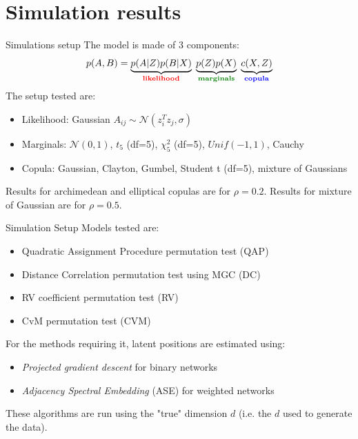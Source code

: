 \documentclass[10.5pt]{beamer}
\begin{document}
\section{Simulation results}

\begin{frame}{Simulations setup}
The model is made of 3 components:
\[
p(A, B) = \underbrace{p(A|Z) p(B|X)}_{\textbf{\color{red}likelihood}} \; \underbrace{p(Z) p(X)}_{\textbf{\color{green!50!black}marginals}} \; \underbrace{c(X, Z)}_{\textbf{\color{blue}copula}}
\]
The setup tested are:
\begin{itemize}
\item {\color{red}Likelihood}: Gaussian $A_{ij}\sim \mathcal{N}(z_i^T z_j, \sigma)$
\item {\color{green!50!black}Marginals}: $\mathcal{N}(0, 1)$, $t_5$ (df=5), $\chi^2_5$ (df=5), $Unif(-1, 1)$, Cauchy
\item {\color{blue}Copula}: Gaussian, Clayton, Gumbel, Student t (df=5), mixture of Gaussians
\end{itemize}
Results for archimedean and elliptical copulas are for $\rho=0.2$. Results for mixture of Gaussian are for $\rho=0.5$.
\end{frame}


\begin{frame}{Simulation Setup}
Models tested are:
\begin{itemize}
    \item Quadratic Assignment Procedure permutation test (QAP)
    \item Distance Correlation permutation test using MGC (DC)
    \item RV coefficient permutation test (RV)
    \item CvM permutation test (CVM)
\end{itemize}

\vspace{.5em}
For the methods requiring it, latent positions are estimated using:
\begin{itemize}
    \item \textit{Projected gradient descent} \citep{ma_universal_2020} for binary networks
    \item \textit{Adjacency Spectral Embedding} (ASE) for weighted networks
\end{itemize}
These algorithms are run using the "true" dimension $d$ (i.e. the $d$ used to generate the data).
\vspace{.5em}

\end{frame}
\end{document}

